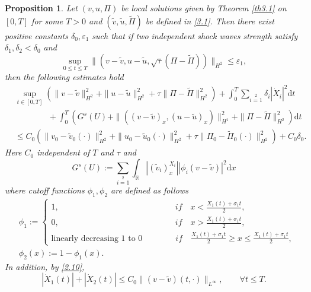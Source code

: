 \documentclass[10pt,a4paper]{amsart}
\newtheorem{prop}{Proposition}
\newcommand{\dif}{\mathrm{d}}
\begin{document}
\begin{prop}\label{p1}
Let $(v, u, \Pi)$ be local solutions given by Theorem \ref{th3.1} on $[0,T]$ for some $T>0$ and $(\widetilde{v},\widetilde{u},\widetilde{\Pi})$ be defined in \eqref{3.1}.  Then there exist positive constants $\delta_0,\varepsilon_1$ such that if two independent shock waves strength satisfy $\delta_1,\delta_2<\delta_0$ and
\begin{equation}\label{3.5}
\sup_{0\le t\le T} \|(v-\widetilde{v}, u-\widetilde{u}, \sqrt{\tau}(\Pi-\widetilde{\Pi}))\|_{H^2}\leq\varepsilon_1,
\end{equation}
then the following estimates hold
\begin{equation}\label{3.6}
\begin{aligned}
&\sup\limits_{t\in[0,T]}\left(\|v-\widetilde{v}\|^2_{H^2}
+\|u-\widetilde{u}\|^2_{H^2}+\tau\|\Pi-\widetilde{\Pi}\|^2_{H^2}\right)
+\int_0^T\sum\limits_{i=1}\limits^2\delta_i|\dot{X}_i|^2\dif t\\
&\qquad\qquad+\int_0^T\left(G^s(U)
+\|\left((v-\widetilde{v})_{x}, (u-\widetilde{u})_{x}\right)\|^2_{H^1}+\|\Pi-\widetilde{\Pi}\|^2_{H^2}\right)\dif t\\
&\leq C_0\left(\|v_0-\widetilde{v}_0(\cdot)\|^2_{H^2}+\|u_0-\widetilde{u}_0(\cdot)\|^2_{H^2}
+\tau\|\Pi_0-\widetilde{\Pi}_0(\cdot)\|^2_{H^2}\right)+C_0\delta_0.
\end{aligned}
\end{equation}
Here $C_0$ independent of $T$ and $\tau$ and
\begin{equation}\label{3.7}
G^s(U):=\sum\limits_{i=1}\limits^2\int_\mathbb{R}|(\widetilde{v}_i)^{X_i}_{x}| |\phi_i(v -\widetilde{v})|^2\dif x
\end{equation}
where cutoff functions $\phi_1,\phi_2$ are defined as follows
\begin{equation}\label{ctf9.15}
\begin{aligned}
&\phi_1:=
\begin{cases}
1,\qquad\qquad\qquad \qquad \qquad \qquad \qquad    if \quad  x<\frac{X_1(t)+\sigma_1t}{2},  \\
0,\qquad\qquad\qquad \qquad \qquad\qquad \qquad     if \quad  x>\frac{X_1(t)+\sigma_1t}{2},  \\
\text{linearly decreasing 1 to 0} \qquad\qquad   if \quad  \frac{X_1(t)+\sigma_1t}{2}\ge x\le \frac{X_1(t)+\sigma_1t}{2},
\end{cases}\\
&\phi_2(x):=1-\phi_1(x).
\end{aligned}
\end{equation}
In addition, by \eqref{2.10},
\begin{equation}\label{3.8}
|\dot{X}_1(t)|+|\dot{X}_2(t)|\leq C_0\|(v-\widetilde{v})(t,\cdot)\|_{L^{\infty}},\qquad\forall t\leq T.
\end{equation}
\end{prop}
\end{document}
